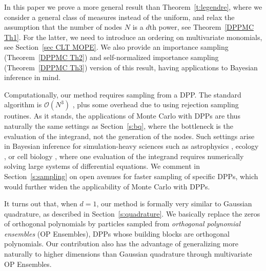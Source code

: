 \documentclass[a4paper,11pt]{article}
\numberwithin{equation}{section}
\theoremstyle{definition}
\newcommand{\eq}{\begin{equation}}
\newcommand{\qe}{\end{equation}}
\newcommand{\cO}{\mathcal{O}}
\newcommand{\Var}{\mathbb{V}{\mathrm{ar}}}
\begin{document}
In this paper we prove a more general result than Theorem~\ref{t:legendre}, where we consider a general class of measures instead of the uniform, and relax the assumption that the number of nodes $N$ is a $d$th power, see Theorem~\ref{DPPMC Th1}.
For the latter, we need to introduce an ordering on multivariate monomials, see Section~\ref{sec CLT MOPE}. We also provide an importance sampling (Theorem~\ref{DPPMC Th2}) and self-normalized importance sampling (Theorem~\ref{DPPMC Th3}) version of this result, having  applications to Bayesian inference in mind.





Computationally, our method requires sampling from a DPP. The standard algorithm
 is $\cO(N^3)$ \citep{HKPV06}, plus some overhead due to using rejection sampling routines. As it stands, the applications of Monte Carlo with
 DPPs are thus naturally the same settings as Section~\ref{s:bq}, where the
 bottleneck is the evaluation of the integrand, not the generation of the nodes.
 Such settings arise in Bayesian inference for simulation-heavy sciences such as astrophysics \citep{Tro06}, ecology \citep{PSHNTHE13}, or cell biology \citep{FNCFKSTZSCN11}, where one evaluation of the integrand requires numerically solving large systems of differential equations. We comment in
 Section~\ref{s:sampling} on open avenues for faster sampling of specific DPPs,
 which would further widen the applicability of Monte Carlo with DPPs.

It turns out that, when $d=1$, our method is formally very similar to Gaussian
quadrature, as described in Section~\ref{s:quadrature}. We basically replace the
zeros of orthogonal polynomials by particles sampled from \emph{orthogonal polynomial
ensembles} (OP Ensembles), DPPs whose building blocks are orthogonal polynomials. Our
contribution also has the advantage of generalizing more
naturally to higher dimensions than Gaussian quadrature through
multivariate OP Ensembles.
\end{document}
